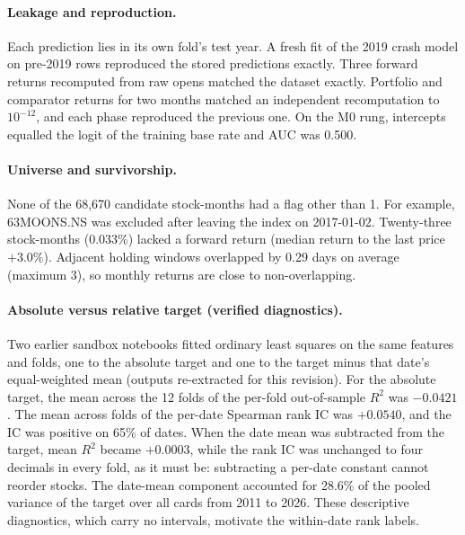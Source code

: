 \documentclass[11pt]{article}
\begin{document}
\paragraph{Leakage and reproduction.} Each prediction lies in its own fold's test year. A fresh fit of the 2019 crash model on pre-2019 rows reproduced the stored predictions exactly. Three forward returns recomputed from raw opens matched the dataset exactly. Portfolio and comparator returns for two months matched an independent recomputation to $10^{-12}$, and each phase reproduced the previous one. On the M0 rung, intercepts equalled the logit of the training base rate and AUC was 0.500.

\paragraph{Universe and survivorship.} None of the 68,670 candidate stock-months had a flag other than 1. For example, 63MOONS.NS was excluded after leaving the index on 2017-01-02. Twenty-three stock-months (0.033\%) lacked a forward return (median return to the last price $+3.0\%$). Adjacent holding windows overlapped by 0.29 days on average (maximum 3), so monthly returns are close to non-overlapping.

\paragraph{Absolute versus relative target (verified diagnostics).}\label{sec:absolute}
Two earlier sandbox notebooks fitted ordinary least squares on the same features and folds, one to the absolute target and one to the target minus that date's equal-weighted mean (outputs re-extracted for this revision). For the absolute target, the mean across the 12 folds of the per-fold out-of-sample $R^2$ was $-0.0421$. The mean across folds of the per-date Spearman rank IC was $+0.0540$, and the IC was positive on 65\% of dates. When the date mean was subtracted from the target, mean $R^2$ became $+0.0003$, while the rank IC was unchanged to four decimals in every fold, as it must be: subtracting a per-date constant cannot reorder stocks. The date-mean component accounted for 28.6\% of the pooled variance of the target over all cards from 2011 to 2026. These descriptive diagnostics, which carry no intervals, motivate the within-date rank labels.

\end{document}
